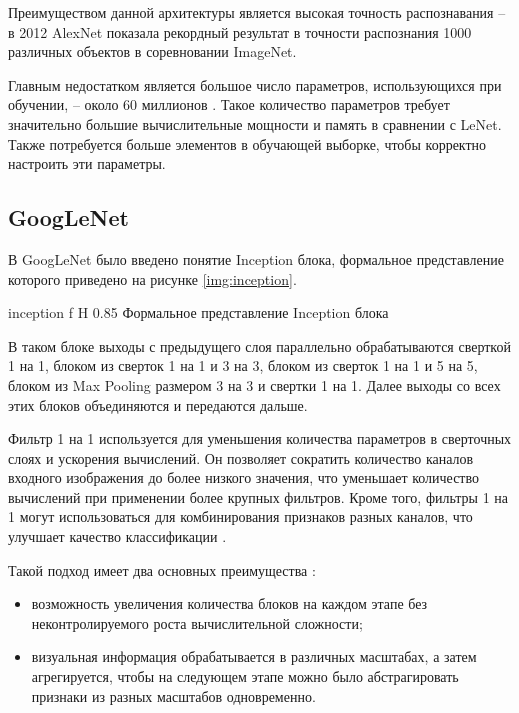 Преимуществом данной архитектуры является высокая точность распознавания -- в 2012 AlexNet показала рекордный результат в точности распознания 1000 различных объектов в соревновании ImageNet.

Главным недостатком является большое число параметров, использующихся при обучении, -- около 60 миллионов \cite{architectures}. Такое количество параметров требует значительно большие вычислительные мощности и память в сравнении с LeNet. Также потребуется больше элементов в обучающей выборке, чтобы корректно настроить эти параметры.

\subsection{GoogLeNet}

В GoogLeNet было введено понятие Inception блока, формальное представление которого приведено на рисунке \ref{img:inception}.

{inception} %
{f} %
{H} %
{0.85\textwidth} %
{Формальное представление Inception блока} %

В таком блоке выходы с предыдущего слоя параллельно обрабатываются сверткой 1 на 1, блоком из сверток 1 на 1 и 3 на 3, блоком из сверток 1 на 1 и 5 на 5, блоком из Max Pooling размером 3 на 3 и свертки 1 на 1. Далее выходы со всех этих блоков объединяются и передаются дальше.

Фильтр 1 на 1 используется для уменьшения количества параметров в сверточных слоях и ускорения вычислений. Он позволяет сократить количество каналов входного изображения до более низкого значения, что уменьшает количество вычислений при применении более крупных фильтров. Кроме того, фильтры 1 на 1 могут использоваться для комбинирования признаков разных каналов, что улучшает качество классификации \cite{googlenet}.

Такой подход имеет два основных преимущества \cite{googlenet}:
\begin{itemize}
	\item возможность увеличения количества блоков на каждом этапе без неконтролируемого роста вычислительной сложности;
	\item визуальная информация обрабатывается в различных масштабах, а затем агрегируется, чтобы на следующем этапе можно было абстрагировать признаки из разных масштабов одновременно.
\end{itemize}

